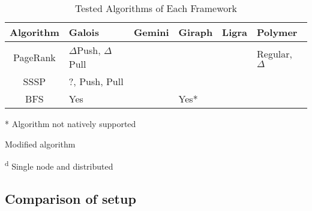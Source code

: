 \newcommand{\txtdag}{\textsuperscript{\textdagger}}
\begin{table}
	\renewcommand{\arraystretch}{1.3}
	\centering
	\caption{Tested Algorithms of Each Framework}
	\begin{tabularx}{0.9\columnwidth}{cYYYYY}
		\bf{Algorithm}&Galois&Gemini&Giraph&Ligra&Polymer\\\hline
		PageRank&$\Delta$Push, $\Delta$Pull&&&&Regular, $\Delta$\\\hline
		SSSP&?, Push, Pull&&&&\\\hline
		BFS&Yes&&Yes*&&\\
		\hline
	\end{tabularx}
	\label{tbl:algorithms}

	{\vspace*{1ex}* Algorithm not natively supported

	\txtdag{} Modified algorithm

	\textsuperscript{d} Single node and distributed
	}

\end{table}


\subsection{Comparison of setup}

